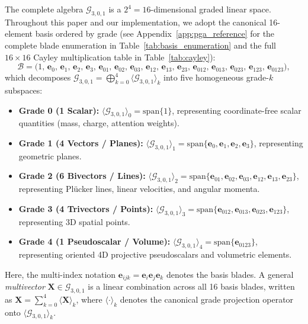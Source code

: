 \documentclass[10pt]{article}
\begin{document}
The complete algebra $\mathcal{G}_{3,0,1}$ is a $2^4 = 16$-dimensional graded linear space. Throughout this paper and our implementation, we adopt the canonical 16-element basis ordered by grade (see Appendix~\ref{app:pga_reference} for the complete blade enumeration in Table~\ref{tab:basis_enumeration} and the full $16 \times 16$ Cayley multiplication table in Table~\ref{tab:cayley}):
\begin{equation}
    \mathcal{B} = \big( 1,\, \mathbf{e}_0,\, \mathbf{e}_1,\, \mathbf{e}_2,\, \mathbf{e}_3,\, \mathbf{e}_{01},\, \mathbf{e}_{02},\, \mathbf{e}_{03},\, \mathbf{e}_{12},\, \mathbf{e}_{13},\, \mathbf{e}_{23},\, \mathbf{e}_{012},\, \mathbf{e}_{013},\, \mathbf{e}_{023},\, \mathbf{e}_{123},\, \mathbf{e}_{0123} \big),
    \label{eq:basis_order}
\end{equation}
which decomposes $\mathcal{G}_{3,0,1} = \bigoplus_{k=0}^4 \langle \mathcal{G}_{3,0,1} \rangle_k$ into five homogeneous grade-$k$ subspaces:
\begin{itemize}
    \item \textbf{Grade 0 (1 Scalar):} $\langle \mathcal{G}_{3,0,1} \rangle_0 = \mathrm{span}\{1\}$, representing coordinate-free scalar quantities (mass, charge, attention weights).
    \item \textbf{Grade 1 (4 Vectors / Planes):} $\langle \mathcal{G}_{3,0,1} \rangle_1 = \mathrm{span}\{\mathbf{e}_0, \mathbf{e}_1, \mathbf{e}_2, \mathbf{e}_3\}$, representing geometric planes.
    \item \textbf{Grade 2 (6 Bivectors / Lines):} $\langle \mathcal{G}_{3,0,1} \rangle_2 = \mathrm{span}\{\mathbf{e}_{01}, \mathbf{e}_{02}, \mathbf{e}_{03}, \mathbf{e}_{12}, \mathbf{e}_{13}, \mathbf{e}_{23}\}$, representing Plücker lines, linear velocities, and angular momenta.
    \item \textbf{Grade 3 (4 Trivectors / Points):} $\langle \mathcal{G}_{3,0,1} \rangle_3 = \mathrm{span}\{\mathbf{e}_{012}, \mathbf{e}_{013}, \mathbf{e}_{023}, \mathbf{e}_{123}\}$, representing 3D spatial points.
    \item \textbf{Grade 4 (1 Pseudoscalar / Volume):} $\langle \mathcal{G}_{3,0,1} \rangle_4 = \mathrm{span}\{\mathbf{e}_{0123}\}$, representing oriented 4D projective pseudoscalars and volumetric elements.
\end{itemize}
Here, the multi-index notation $\mathbf{e}_{ijk} = \mathbf{e}_i \mathbf{e}_j \mathbf{e}_k$ denotes the basis blades. A general \emph{multivector} $\mathbf{X} \in \mathcal{G}_{3,0,1}$ is a linear combination across all 16 basis blades, written as $\mathbf{X} = \sum_{k=0}^4 \langle \mathbf{X} \rangle_k$, where $\langle \cdot \rangle_k$ denotes the canonical grade projection operator onto $\langle \mathcal{G}_{3,0,1} \rangle_k$.
\end{document}
